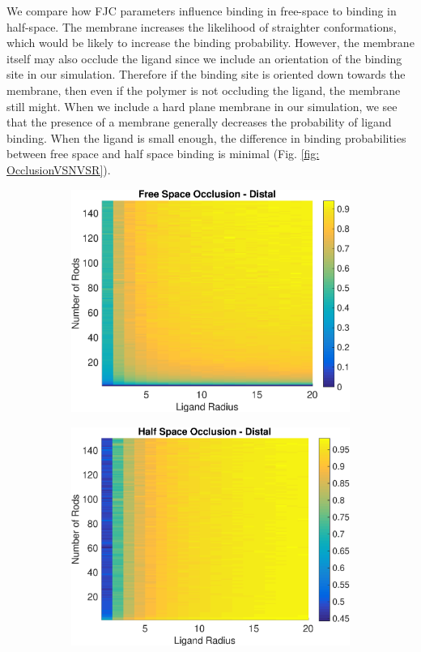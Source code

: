 \documentclass[../../AdvancementSummary.tex]{subfiles}
\begin{document}
We compare how FJC parameters influence binding in free-space to binding in half-space. The membrane increases the likelihood of straighter conformations, which would be likely to increase the binding probability. However, the membrane itself may also occlude the ligand since we include an orientation of the binding site in our simulation. Therefore if the binding site is oriented down towards the membrane, then even if the polymer is not occluding the ligand, the membrane still might. When we include a hard plane membrane in our simulation, we see that the presence of a membrane generally decreases the probability of ligand binding. When the ligand is small enough, the difference in binding probabilities between free space and half space binding is minimal (Fig. \ref{fig: OcclusionVSNVSR}).

\begin{figure}[H]
\begin{center}
\begin{subfigure}{0.4\linewidth}
\includegraphics[width=\linewidth]{ResultsFigures/General/OcclusionVSNVSRFree.eps}
\caption{}
\end{subfigure}
\begin{subfigure}{0.4\linewidth}
\includegraphics[width=\linewidth]{ResultsFigures/General/OcclusionVSNVSRHalf.eps}

\end{subfigure}
\end{center}
\end{figure}
\end{document}
